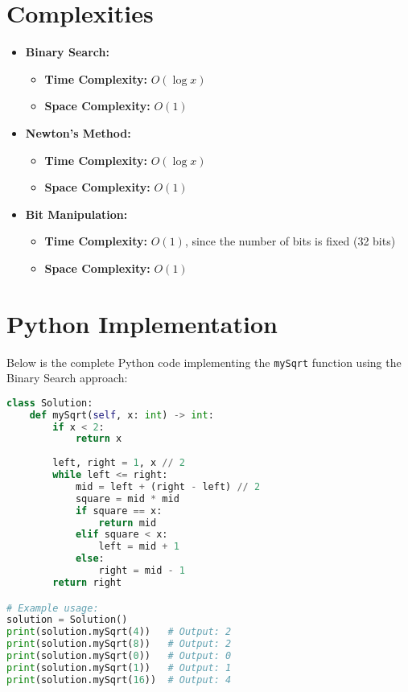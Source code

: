 \section*{Complexities}

\begin{itemize}
    \item \textbf{Binary Search:}
    \begin{itemize}
        \item \textbf{Time Complexity:} \(O(\log x)\)
        \item \textbf{Space Complexity:} \(O(1)\)
    \end{itemize}
    
    \item \textbf{Newton's Method:}
    \begin{itemize}
        \item \textbf{Time Complexity:} \(O(\log x)\)
        \item \textbf{Space Complexity:} \(O(1)\)
    \end{itemize}
    
    \item \textbf{Bit Manipulation:}
    \begin{itemize}
        \item \textbf{Time Complexity:} \(O(1)\), since the number of bits is fixed (32 bits)
        \item \textbf{Space Complexity:} \(O(1)\)
    \end{itemize}
\end{itemize}

\section*{Python Implementation}


Below is the complete Python code implementing the \texttt{mySqrt} function using the Binary Search approach:

\begin{fullwidth}
\begin{lstlisting}[language=Python]
class Solution:
    def mySqrt(self, x: int) -> int:
        if x < 2:
            return x
        
        left, right = 1, x // 2
        while left <= right:
            mid = left + (right - left) // 2
            square = mid * mid
            if square == x:
                return mid
            elif square < x:
                left = mid + 1
            else:
                right = mid - 1
        return right

# Example usage:
solution = Solution()
print(solution.mySqrt(4))   # Output: 2
print(solution.mySqrt(8))   # Output: 2
print(solution.mySqrt(0))   # Output: 0
print(solution.mySqrt(1))   # Output: 1
print(solution.mySqrt(16))  # Output: 4
\end{lstlisting}
\end{fullwidth}

